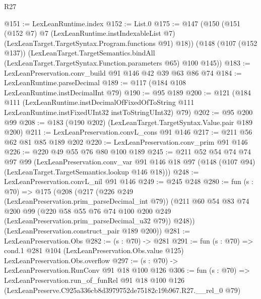 \begin{lexlean}{R27}
\begin{coremodule}
@151 := LexLeanRuntime.index
@152 := List.{0}
@175 := @147
    (@150
      (@151
        (@152 @7)
        @7
        (LexLeanRuntime.instIndexableList @7)
        (LexLeanTarget.TargetSyntax.Program.functions @91)
        @18))
    (@148
      (@107 (@152 @137))
      (LexLeanTarget.TargetSemantics.bindAll
        (LexLeanTarget.TargetSyntax.Function.parameters @65)
        @100
        @145))
@183 := LexLeanPreservation.conv_build @91 @146 @42 @39 @63 @86 @74
@184 := LexLeanRuntime.parseDecimal
@189 := @117 (@184 @108 LexLeanRuntime.instDecimalInt @79)
@190 := @95 @189
@200 := @121
    (@184
      @111
      (LexLeanRuntime.instDecimalOfFixedOfToString
        @111
        LexLeanRuntime.instFixedUInt32
        instToStringUInt32)
      @79)
@202 := @95 @200 @99
@208 := @183 (@190 @202) (LexLeanTarget.TargetSyntax.Value.pair @189 @200)
@211 := LexLeanPreservation.convL_cons @91 @146
@217 := @211 @56 @62 @81 @85 @189 @202
@220 := LexLeanPreservation.conv_prim @91 @146
@226 := @220 @49 @55 @76 @80 @100 @189
@245 := @211
    @52
    @54
    @74
    @74
    @97
    @99
    (LexLeanPreservation.conv_var
      @91
      @146
      @18
      @97
      (@148 (@107 @94) (LexLeanTarget.TargetSemantics.lookup @146 @18)))
@248 := LexLeanPreservation.convL_nil @91 @146
@249 := @245 @248
@280 := fun (s : @70) =>
  @175
    (@208
      (@217
        (@226 @249 (LexLeanPreservation.prim_parseDecimal_int @79))
        (@211
          @60
          @54
          @83
          @74
          @200
          @99
          (@220 @58 @55 @76 @74 @100 @200 @249 (LexLeanPreservation.prim_parseDecimal_u32 @79))
          @248))
      (LexLeanPreservation.construct_pair @189 @200))
@281 := LexLeanPreservation.Obs
@282 := (s : @70) -> @281
@291 := fun (s : @70) =>
  cond.{1} @281 @104 (LexLeanPreservation.Obs.value @125) LexLeanPreservation.Obs.overflow
@297 := (s : @70) -> LexLeanPreservation.RunConv @91 @18 @100 @126
@306 := fun (s : @70) =>
  LexLeanPreservation.run_of_funRel
    @91
    @18
    @100
    @126
    (LexLeanPreserve.C925a336cb8d3979752de75182c19b967.R27.__rel_0 @79)
\end{coremodule}
\end{lexlean}
